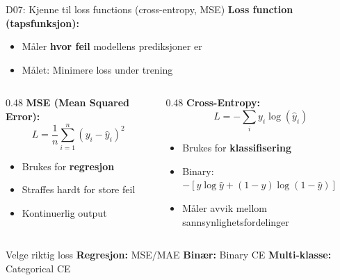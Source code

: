 \documentclass[aspectratio=169, 10pt]{beamer}
\begin{document}
\begin{frame}{D07: Kjenne til loss functions (cross-entropy, MSE)}
    \textbf{Loss function (tapsfunksjon):}
    \begin{itemize}
        \item Måler \textbf{hvor feil} modellens prediksjoner er
        \item Målet: Minimere loss under trening
    \end{itemize}
    
    \vspace{0.3cm}
    \begin{columns}[T]
        \begin{column}{0.48\textwidth}
            \textbf{MSE (Mean Squared Error):}
            \[
            L = \frac{1}{n}\sum_{i=1}^{n}(y_i - \hat{y}_i)^2
            \]
            \begin{itemize}
                \item Brukes for \textbf{regresjon}
                \item Straffes hardt for store feil
                \item Kontinuerlig output
            \end{itemize}
        \end{column}
        \begin{column}{0.48\textwidth}
            \textbf{Cross-Entropy:}
            \[
            L = -\sum_{i} y_i \log(\hat{y}_i)
            \]
            \begin{itemize}
                \item Brukes for \textbf{klassifisering}
                \item Binary: $-[y\log\hat{y} + (1-y)\log(1-\hat{y})]$
                \item Måler avvik mellom sannsynlighetsfordelinger
            \end{itemize}
        \end{column}
    \end{columns}
    
    \vspace{0.2cm}
    \begin{block}{\footnotesize Velge riktig loss}
        \footnotesize
        \textbf{Regresjon:} MSE/MAE \quad \textbf{Binær:} Binary CE \quad \textbf{Multi-klasse:} Categorical CE
    \end{block}
\end{frame}

\end{document}
